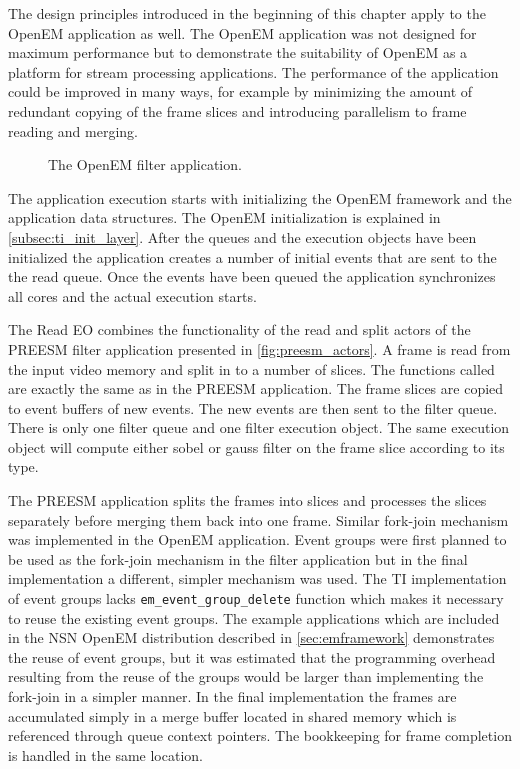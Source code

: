 The design principles introduced in the beginning of this chapter apply to the
OpenEM application as well. The OpenEM application was not designed for maximum
performance but to demonstrate the suitability of OpenEM as a platform for
stream processing applications. The performance of the application could be
improved in many ways, for example by minimizing the amount of redundant copying
of the frame slices and introducing parallelism to frame reading and merging.

\begin{figure}[h!]
    \label{fig:openem_flow}
    \begin{center}
        
        \caption{The OpenEM filter application.}
    \end{center}
\end{figure}

The application execution starts with initializing the OpenEM framework and the
application data structures. The OpenEM initialization is explained in
\ref{subsec:ti_init_layer}. After the queues and the execution objects have been
initialized the application creates a number of initial events that are sent to
the the read queue. Once the events have been queued the application
synchronizes all cores and the actual execution starts.

The Read EO combines the functionality of the read and split actors of the
PREESM filter application presented in \ref{fig:preesm_actors}. A frame is read
from the input video memory and split in to a number of slices. The functions
called are exactly the same as in the PREESM application. The frame slices are
copied to event buffers of new events. The new events are then sent to the
filter queue. There is only one filter queue and one filter execution object.
The same execution object will compute either sobel or gauss filter on the
frame slice according to its type.

The PREESM application splits the frames into slices and processes the slices
separately before merging them back into one frame. Similar fork-join mechanism
was implemented in the OpenEM application. Event groups were first planned to be
used as the fork-join mechanism in the filter application but in the final
implementation a different, simpler mechanism was used. The TI implementation of
event groups lacks \texttt{em\_event\_group\_delete} function which makes it
necessary to reuse the existing event groups. The example applications which are
included in the NSN OpenEM distribution described in \ref{sec:emframework}
demonstrates the reuse of event groups, but it was estimated that the
programming overhead resulting from the reuse of the groups would be larger than
implementing the fork-join in a simpler manner. In the final implementation the
frames are accumulated simply in a merge buffer located in shared memory which
is referenced through queue context pointers. The bookkeeping for frame
completion is handled in the same location.

